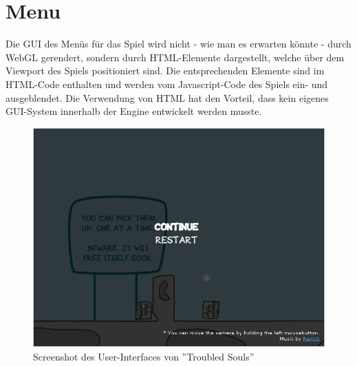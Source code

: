 \newpage
\section{Menu}

Die GUI des Menüs für das Spiel wird nicht - wie man es erwarten könnte - durch WebGL gerendert, sondern durch HTML-Elemente dargestellt, welche über dem Viewport des Spiels positioniert sind. Die entsprechenden Elemente sind im HTML-Code enthalten und werden vom Javascript-Code des Spiels ein- und ausgeblendet. Die Verwendung von HTML hat den Vorteil, dass kein eigenes GUI-System innerhalb der Engine entwickelt werden musste.

\begin{figure}[h] %
	\centering
		\includegraphics[scale=0.6]{images/screenshot_ui.png}
	\caption{Screenshot des User-Interfaces von ''Troubled Souls''}
\end{figure}

